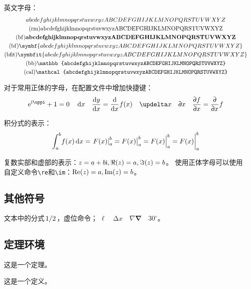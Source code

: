 英文字母：
\begin{gather*}
  abcdefghijklmnopqrstuvwxyzABCDEFGHIJKLMNOPQRSTUVWXYZ
  \\
  (\mathrm{rm})\mathrm{abcdefghijklmnopqrstuvwxyzABCDEFGHIJKLMNOPQRSTUVWXYZ}
  \\
  (\mathrm{bf})\mathbf{abcdefghijklmnopqrstuvwxyzABCDEFGHIJKLMNOPQRSTUVWXYZ}
  \\
  (\mathrm{bf})\symbf{abcdefghijklmnopqrstuvwxyzABCDEFGHIJKLMNOPQRSTUVWXYZ}
  \\
  (\mathrm{bfit})\symbfit{abcdefghijklmnopqrstuvwxyzABCDEFGHIJKLMNOPQRSTUVWXYZ}
  \\
  (\mathrm{bb})\mathbb{abcdefghijklmnopqrstuvwxyzABCDEFGHIJKLMNOPQRSTUVWXYZ}
  \\
  (\mathrm{cal})\mathcal{abcdefghijklmnopqrstuvwxyzABCDEFGHIJKLMNOPQRSTUVWXYZ}
\end{gather*}

对于常用正体的字母，在配置文件中增加快捷键：
\begin{align*}
  \me^{\mi\mpi}+1=0 \quad \dif x \quad 
  \mdd{y}{x}=\frac{\md }{\md x}f(x) \quad
  \mdl x \quad \uppartial x \quad \mpp{f}{x} =\mpp{}{x}f
\end{align*}

积分式的表示：
\begin{equation*}
  \int_a^b\! f(x)\mathop{}\!\mathrm{d} x = \left.F(x)\right|_a^b=F(x)\big|_a^b=F(x)\Big|_a^b=F(x)\bigg|_a^b
\end{equation*}

复数实部和虚部的表示：$z=a+b\mathrm{i},\Re(z)=a,\Im(z)=b$。
使用正体字母可以使用自定义命令\verb|\re|和\verb|\im|：$\mathrm{Re}(z)=a,\mathrm{Im}(z)=b$。


\subsection{其他符号}

文本中的分式$\left.1\middle/2\right.$，虚位\phantom{字}命令；
$\ell \quad \increment x \quad \nabla \mbfnabla \quad 30^{\circ} $。

\subsection{定理环境}

\begin{theorem}[定理名字]
  这是一个定理。
\end{theorem}

\begin{definition}[定义名字]
  这是一个定义。
\end{definition}


